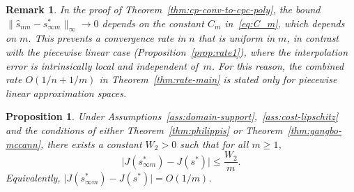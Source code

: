 \documentclass[12pt,leqno]{amsart}
\newtheorem{remark}{Remark}
\newtheorem{proposition}{Proposition}
\begin{document}
\begin{remark}\label{rem:poly-rate}
In the proof of Theorem~\ref{thm:cp-conv-to-cpc-poly}, the bound
$\|\hat{s}_{nm}-s_{\infty m}^*\|_\infty\to 0$ depends on the
constant $C_m$ in~\eqref{eq:C_m}, which depends on $m$.  This
prevents a convergence rate in $n$ that is uniform in $m$, in
contrast with the piecewise linear case
(Proposition~\ref{prop:rate1}), where the interpolation error is
intrinsically local and independent of~$m$.  For this reason, the
combined rate $O(1/n+1/m)$ in Theorem~\ref{thm:rate-main} is stated
only for piecewise linear approximation spaces.
\end{remark}

\begin{proposition}\label{prop:rate2}
Under Assumptions~\ref{ass:domain-support},~\ref{ass:cost-lipschitz} and the conditions of either Theorem~\ref{thm:philippis} or Theorem~\ref{thm:gangbo-mccann}, there exists a constant $W_2>0$ such that for all $m\ge 1$,
\[
\bigl|J(s_{\infty m}^*)-J(s^*)\bigr|\le \frac{W_2}{m}.
\]
Equivalently, $\bigl|J(s_{\infty m}^*)-J(s^*)\bigr|=O(1/m)$.
\end{proposition}
\end{document}
